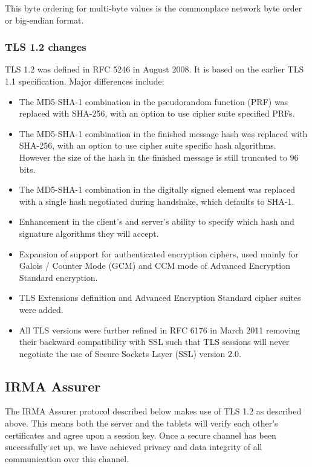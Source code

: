 This byte ordering for multi-byte values is the commonplace network byte order or big-endian format.~\cite{tls1.2}

\subsubsection{TLS 1.2 changes}
TLS 1.2 was defined in RFC 5246 in August 2008. It is based on the earlier TLS 1.1 specification. Major differences include:

\begin{itemize}
	\item The MD5-SHA-1 combination in the pseudorandom function (PRF) was replaced with SHA-256, with an option to use cipher suite specified PRFs.
  \item The MD5-SHA-1 combination in the finished message hash was replaced with SHA-256, with an option to use cipher suite specific hash algorithms. However the size of the hash in the finished message is still truncated to 96 bits.
  \item The MD5-SHA-1 combination in the digitally signed element was replaced with a single hash negotiated during handshake, which defaults to SHA-1.
  \item Enhancement in the client's and server's ability to specify which hash and signature algorithms they will accept.
  \item Expansion of support for authenticated encryption ciphers, used mainly for Galois / Counter Mode (GCM) and CCM mode of Advanced Encryption Standard encryption.
  \item TLS Extensions definition and Advanced Encryption Standard cipher suites were added.
  \item All TLS versions were further refined in RFC 6176 in March 2011 removing their backward compatibility with SSL such that TLS sessions will never negotiate the use of Secure Sockets Layer (SSL) version 2.0.
\end{itemize}

\subsection{IRMA Assurer}
The IRMA Assurer protocol described below makes use of TLS 1.2 as described above. This means both the server and the tablets will verify each other's certificates and agree upon a session key. Once a secure channel has been successfully set up, we have achieved privacy and data integrity of all communication over this channel.~\cite{tls1.2} 
